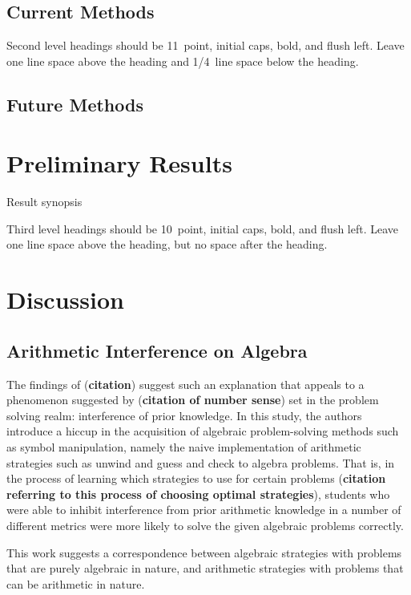 \documentclass[10pt,letterpaper]{article}
\begin{document}
\subsection{Current Methods}

Second level headings should be 11~point, initial caps, bold, and
flush left. Leave one line space above the heading and 1/4~line
space below the heading.
\subsection{Future Methods}

\section{Preliminary Results}

Result synopsis

Third level headings should be 10~point, initial caps, bold, and flush
left. Leave one line space above the heading, but no space after the
heading.


\section{Discussion}

\subsection{Arithmetic Interference on Algebra}

The findings of (\textbf{citation}) suggest such an explanation that appeals to a phenomenon suggested by (\textbf{citation of number sense}) set in the problem solving realm: interference of prior knowledge. In this study, the authors introduce a hiccup in the acquisition of algebraic problem-solving methods such as symbol manipulation, namely the naive implementation of arithmetic strategies such as unwind and guess and check to algebra problems. That is, in the process of learning which strategies to use for certain problems (\textbf{citation referring to this process of choosing optimal strategies}), students who were able to inhibit interference from prior arithmetic knowledge in a number of different metrics were more likely to solve the given algebraic problems correctly.

This work suggests a correspondence between algebraic strategies with problems that are purely algebraic in nature, and arithmetic strategies with problems that can be arithmetic in nature.
\end{document}
